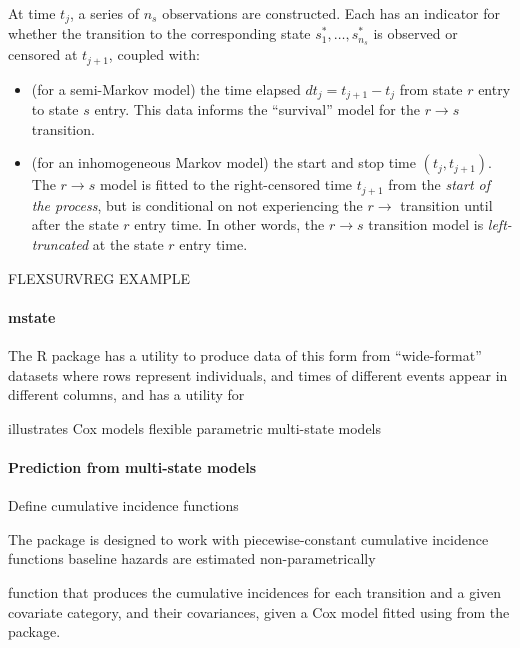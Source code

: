 \documentclass[nojss,nofooter]{jss}
\begin{document}
At time $t_j$, a series of $n_s$ observations are constructed.  Each
has an indicator for whether the transition to the corresponding state
$s^*_1,\ldots,s^*_{n_s}$ is observed or censored at $t_{j+1}$, coupled
with:
\begin{itemize}
\item (for a semi-Markov model) the time elapsed $dt_{j} = t_{j+1} -
  t_{j}$ from state $r$ entry to state $s$ entry.  This data informs
  the ``survival'' model for the $r \rightarrow s$ transition.
  
\item (for an inhomogeneous Markov model) the start and stop time
  $(t_j,t_{j+1})$.  The $r \rightarrow s$ model is fitted to the
  right-censored time $t_{j+1}$ from the \emph{start of the process},
  but is conditional on not experiencing the $r \rightarrow$
  transition until after the state $r$ entry time.  In other words,
  the $r \rightarrow s$ transition model is \emph{left-truncated} at
  the state $r$ entry time.
\end{itemize}

FLEXSURVREG EXAMPLE

\paragraph{mstate}

The  R package \citep{mstate:cmpb,mstate:jss} has a
utility  to produce data of this form from
``wide-format'' datasets where rows represent individuals, and times
of different events appear in different columns, and  has
a utility  for 

illustrates Cox models
flexible parametric multi-state models 

\paragraph{Prediction from multi-state models}

Define cumulative incidence functions

The  package is designed to work with 
piecewise-constant cumulative incidence functions
baseline hazards are estimated non-parametrically 
\citep{mstate:cmpb,mstate:jss} 

function  that produces the cumulative incidences for each transition and a given covariate category, and their covariances, given a Cox model fitted using  from the  package. 
\end{document}
